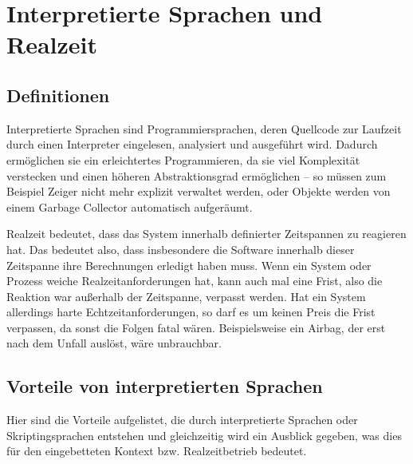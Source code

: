 \section{Interpretierte Sprachen und Realzeit}


\subsection{Definitionen}


Interpretierte Sprachen sind Programmiersprachen, deren Quellcode zur Laufzeit
durch einen Interpreter eingelesen, analysiert und ausgeführt wird. Dadurch
ermöglichen sie ein erleichtertes Programmieren, da sie viel Komplexität
verstecken und einen höheren Abstraktionsgrad ermöglichen -- so müssen zum
Beispiel Zeiger nicht mehr explizit verwaltet werden, oder Objekte werden von
einem Garbage Collector automatisch aufgeräumt.


Realzeit bedeutet, dass das System innerhalb definierter Zeitspannen zu
reagieren hat. Das bedeutet also, dass insbesondere die Software innerhalb
dieser Zeitspanne ihre Berechnungen erledigt haben muss.
Wenn ein System oder Prozess weiche Realzeitanforderungen hat, kann auch mal
eine Frist, also die Reaktion war außerhalb der Zeitspanne, verpasst werden.
Hat ein System allerdings harte Echtzeitanforderungen, so darf es um keinen
Preis die Frist verpassen, da sonst die Folgen fatal wären. Beispielsweise
ein Airbag, der erst nach dem Unfall auslöst, wäre unbrauchbar.


\subsection{Vorteile von interpretierten Sprachen}


Hier sind die Vorteile aufgelistet, die durch interpretierte Sprachen oder
Skriptingsprachen entstehen und gleichzeitig wird ein Ausblick gegeben, was
dies für den eingebetteten Kontext bzw. Realzeitbetrieb bedeutet.


